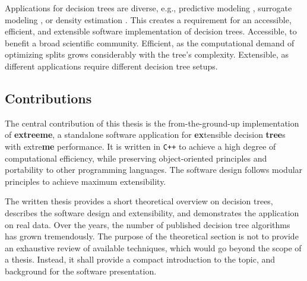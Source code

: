 \documentclass[a4paper, 11pt]{article}
\begin{document}
\par
Applications for decision trees are diverse, e.g., predictive modeling \cite{hastie_elemstatlearn}, surrogate modeling \cite{schaaf_surrogate_tree}, or density estimation \cite{ram_density_estimation_tree}. This creates a requirement for an accessible, efficient, and extensible software implementation of decision trees. Accessible, to benefit a broad scientific community. Efficient, as the computational demand of optimizing splits grows considerably with the tree's complexity. Extensible, as different applications require different decision tree setups.
\par

\subsection{Contributions} The central contribution of this thesis is the from-the-ground-up implementation of 
\textbf{extreeme}, a standalone software application for \textbf{ex}tensible decision \textbf{tree}s with extre\textbf{me} performance.
It is written in \texttt{C++} to achieve a high degree of computational efficiency, while preserving object-oriented principles and portability to other programming languages. The software design follows modular principles to achieve maximum extensibility.
\par
The written thesis provides a short theoretical overview on decision trees, describes the software design and extensibility, and demonstrates the application on real data. Over the years, the number of published decision tree algorithms has grown tremendously. The purpose of the theoretical section is not to provide an exhaustive review of available techniques, which would go beyond the scope of a thesis. Instead, it shall provide a compact introduction to the topic, and background for the software presentation.
\end{document}
